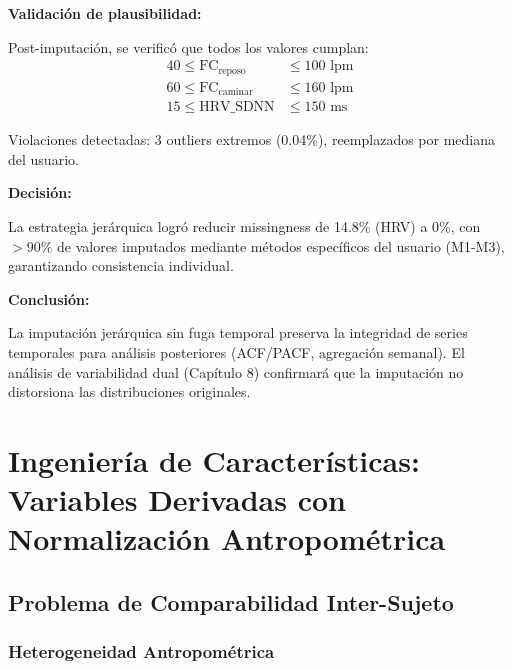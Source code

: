 \documentclass[12pt,letterpaper,twoside]{report}
\begin{document}
\begin{calculobox}
\textbf{Validación de plausibilidad:}

Post-imputación, se verificó que todos los valores cumplan:
\begin{align}
40 \leq \text{FC}_{\text{reposo}} &\leq 100 \text{ lpm} \\
60 \leq \text{FC}_{\text{caminar}} &\leq 160 \text{ lpm} \\
15 \leq \text{HRV\_SDNN} &\leq 150 \text{ ms}
\end{align}

Violaciones detectadas: 3 outliers extremos (0.04\%), reemplazados por mediana del usuario.
\end{calculobox}

\begin{decisionbox}
\textbf{Decisión:}

La estrategia jerárquica logró reducir missingness de 14.8\% (HRV) a 0\%, con $>90\%$ de valores imputados mediante métodos específicos del usuario (M1-M3), garantizando consistencia individual.
\end{decisionbox}

\begin{conclusionbox}
\textbf{Conclusión:}

La imputación jerárquica sin fuga temporal preserva la integridad de series temporales para análisis posteriores (ACF/PACF, agregación semanal). El análisis de variabilidad dual (Capítulo 8) confirmará que la imputación no distorsiona las distribuciones originales.
\end{conclusionbox}

\chapter{Ingeniería de Características: Variables Derivadas con Normalización Antropométrica}

\section{Problema de Comparabilidad Inter-Sujeto}

\subsection{Heterogeneidad Antropométrica}
\end{document}
